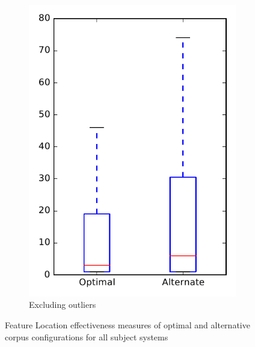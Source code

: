 \begin{figure}
\begin{subfigure}{.4\textwidth}
        \includegraphics[height=0.4\textheight]{figures/combo/flt_rq2_overview_no_outlier}
        \caption{Excluding outliers}\label{fig:combo:flt:rq2:overview_no_outlier}
    \end{subfigure}
\caption{Feature Location effectiveness measures of optimal and alternative corpus configurations for all subject systems}
\label{fig:combo:flt:rq2:overview}
\end{figure}
